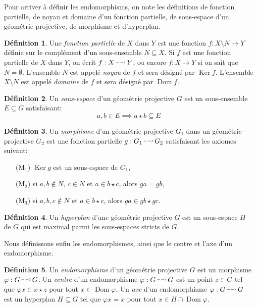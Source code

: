 \documentclass[12pt, oneside]{memoir}
\theoremstyle{definition}
\newtheorem{defn}{Définition}
\newcommand*{\DashedArrow}[1][]{\mathbin{\tikz [baseline=-0.25ex,-latex, dashed,#1] \draw [#1] (0pt,0.5ex) -- (1.3em,0.5ex);}}%
\newcommand{\partialto}{\DashedArrow[->,dash pattern=on 4pt off 2pt]}
\DeclareMathOperator{\kernel}{Ker}
\DeclareMathOperator{\domain}{Dom}
\begin{document}
Pour arriver à définir les endomorphisms, on note les définitions de
fonction partielle, de noyau et domaine d'un fonction partielle, de
sous-espace d'un géométrie projective, de morphisme et d'hyperplan.
\begin{defn}
  Une \textit{fonction partielle} de $X$ dans $Y$ est une fonction
  $f: X \setminus N \to Y$ définie sur le complément d'un
  sous-ensemble $N \subseteq X$. Si $f$ est une fonction partielle de
  $X$ dans $Y$, on écrit $f: X \partialto Y$, ou encore $f: X \to Y$
  si on sait que $N = \emptyset$. L'ensemble $N$ est appelé
  \textit{noyau} de $f$ et sera désigné par $\kernel f$. L'ensemble
  $X \setminus N$ est appelé \textit{domaine} de $f$ et sera désigné
  par $\domain f$.
\end{defn}
\begin{defn}
  Un \textit{sous-espace} d'un géométrie projective $G$ est un sous-ensemble $E
  \subseteq G$ satisfaisant:
  \begin{equation*}
    \label{subspace}
    a,b \in E \implies a \star b \subseteq E
  \end{equation*}
\end{defn}
\begin{defn}
  Un \textit{morphisme} d'un géométrie projective $G_1$ dans un
  géométrie projective $G_2$ est une fonction partielle $g: G_1
  \partialto G_2$ satisfaisant les axiomes suivant:
  \begin{itemize}[align=left]
  \item[($\text{M}_1$)] $\kernel g$ est un sous-espace de $G_1$,
  \item[($\text{M}_2$)] si $a, b \not\in N$, $c \in N$ et $a \in b
    \star c$, alors $ga = gb$,
  \item[($\text{M}_3$)] si $a, b, c \not\in N$ et $a \in b \star c$,
    alors $ga \in gb \star gc$.
  \end{itemize}
\end{defn}
\begin{defn}
  Un \textit{hyperplan} d'une géométrie projective $G$ est un
  sous-espace $H$ de $G$ qui est maximal parmi les sous-espaces
  stricts de $G$.
\end{defn}
Nous définissons enfin les endomorphismes, ainsi que le centre et
l'axe d'un endomorphisme.
\begin{defn}
  Un \textit{endomorphisme} d'un géométrie projective $G$ est un
  morphisme $\varphi: G \partialto G$. Un \textit{centre} d'un
  endomorphisme $\varphi: G \partialto G$ est un point $z \in G$ tel
  que $\varphi x \in x \star z$ pour tout $x \in \domain \varphi$. Un
  \textit{axe} d'un endomorphisme $\varphi: G \partialto G$ est un
  hyperplan $H \subseteq G$ tel que $\varphi x = x$ pour tout $x \in H
  \cap \domain \varphi$.
\end{defn}
\end{document}
